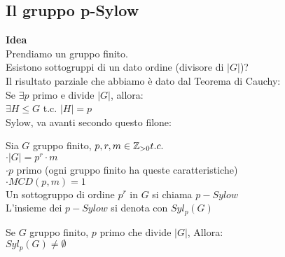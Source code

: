 \documentclass[12px]{article}
\begin{document}
	\subsection{Il gruppo p-Sylow}
	\textbf{Idea}\\
	Prendiamo un gruppo finito.\\
	Esistono sottogruppi di un dato ordine (divisore di $|G|$)?\\
	Il risultato parziale che abbiamo è dato dal Teorema di Cauchy:\\
	Se  $\exists p$ primo e divide  $|G|$, allora:\\
	 $\exists H\leq G$ t.c. $|H| = p$ \\
	 Sylow, va avanti secondo questo filone:\\\newpage
	 \begin{defi}
		 Sia $G$ gruppo finito, $p,r,m\in\mathbb{Z}_{>0} t.c.$\\
		  $\cdot |G| = p^r\cdot m$\\
		   $\cdot p$ primo \hfill (ogni gruppo finito ha queste caratteristiche)\\
		   $\cdot MCD(p,m) = 1$\\
	 Un sottogruppo di ordine $p^r$ in $G$ si chiama $p-Sylow$\\
	 L'insieme dei  $p-Sylow$ si denota con $Syl_p(G)$\\
	 \end{defi}
	 \begin{teo}
	 	Se $G$ gruppo finito, $p$ primo che divide $|G|$, Allora:\\
		 $Syl_p(G)\neq \emptyset$
	 \end{teo}
\end{document}
